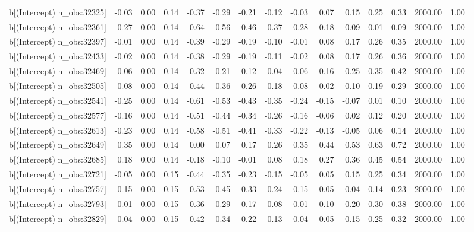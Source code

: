 \begin{table}[ht]
\begin{tabular}{rrrrrrrrrrrrrrr}
  b[(Intercept) n\_obs:32325] & -0.03 & 0.00 & 0.14 & -0.37 & -0.29 & -0.21 & -0.12 & -0.03 & 0.07 & 0.15 & 0.25 & 0.33 & 2000.00 & 1.00 \\ 
  b[(Intercept) n\_obs:32361] & -0.27 & 0.00 & 0.14 & -0.64 & -0.56 & -0.46 & -0.37 & -0.28 & -0.18 & -0.09 & 0.01 & 0.09 & 2000.00 & 1.00 \\ 
  b[(Intercept) n\_obs:32397] & -0.01 & 0.00 & 0.14 & -0.39 & -0.29 & -0.19 & -0.10 & -0.01 & 0.08 & 0.17 & 0.26 & 0.35 & 2000.00 & 1.00 \\ 
  b[(Intercept) n\_obs:32433] & -0.02 & 0.00 & 0.14 & -0.38 & -0.29 & -0.19 & -0.11 & -0.02 & 0.08 & 0.17 & 0.26 & 0.36 & 2000.00 & 1.00 \\ 
  b[(Intercept) n\_obs:32469] & 0.06 & 0.00 & 0.14 & -0.32 & -0.21 & -0.12 & -0.04 & 0.06 & 0.16 & 0.25 & 0.35 & 0.42 & 2000.00 & 1.00 \\ 
  b[(Intercept) n\_obs:32505] & -0.08 & 0.00 & 0.14 & -0.44 & -0.36 & -0.26 & -0.18 & -0.08 & 0.02 & 0.10 & 0.19 & 0.29 & 2000.00 & 1.00 \\ 
  b[(Intercept) n\_obs:32541] & -0.25 & 0.00 & 0.14 & -0.61 & -0.53 & -0.43 & -0.35 & -0.24 & -0.15 & -0.07 & 0.01 & 0.10 & 2000.00 & 1.00 \\ 
  b[(Intercept) n\_obs:32577] & -0.16 & 0.00 & 0.14 & -0.51 & -0.44 & -0.34 & -0.26 & -0.16 & -0.06 & 0.02 & 0.12 & 0.20 & 2000.00 & 1.00 \\ 
  b[(Intercept) n\_obs:32613] & -0.23 & 0.00 & 0.14 & -0.58 & -0.51 & -0.41 & -0.33 & -0.22 & -0.13 & -0.05 & 0.06 & 0.14 & 2000.00 & 1.00 \\ 
  b[(Intercept) n\_obs:32649] & 0.35 & 0.00 & 0.14 & 0.00 & 0.07 & 0.17 & 0.26 & 0.35 & 0.44 & 0.53 & 0.63 & 0.72 & 2000.00 & 1.00 \\ 
  b[(Intercept) n\_obs:32685] & 0.18 & 0.00 & 0.14 & -0.18 & -0.10 & -0.01 & 0.08 & 0.18 & 0.27 & 0.36 & 0.45 & 0.54 & 2000.00 & 1.00 \\ 
  b[(Intercept) n\_obs:32721] & -0.05 & 0.00 & 0.15 & -0.44 & -0.35 & -0.23 & -0.15 & -0.05 & 0.05 & 0.15 & 0.25 & 0.34 & 2000.00 & 1.00 \\ 
  b[(Intercept) n\_obs:32757] & -0.15 & 0.00 & 0.15 & -0.53 & -0.45 & -0.33 & -0.24 & -0.15 & -0.05 & 0.04 & 0.14 & 0.23 & 2000.00 & 1.00 \\ 
  b[(Intercept) n\_obs:32793] & 0.01 & 0.00 & 0.15 & -0.36 & -0.29 & -0.17 & -0.08 & 0.01 & 0.10 & 0.20 & 0.30 & 0.38 & 2000.00 & 1.00 \\ 
  b[(Intercept) n\_obs:32829] & -0.04 & 0.00 & 0.15 & -0.42 & -0.34 & -0.22 & -0.13 & -0.04 & 0.05 & 0.15 & 0.25 & 0.32 & 2000.00 & 1.00 \\ 

\end{tabular}
\end{table}
